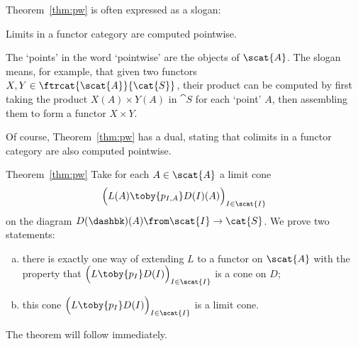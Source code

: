 Theorem~\ref{thm:pw} is often expressed as a slogan:
% 
\begin{slogan}
Limits in a functor category are computed pointwise.%
%
%
%
\end{slogan}
% 
The `points' in the word `pointwise' are the objects of $\scat{A}$.  The
slogan means, for example, that given two functors $X, Y \in
\ftrcat{\scat{A}}{\cat{S}}$, their product can be computed by first taking
the product $X(A) \times Y(A)$ in $\cat{S}$ for each `point' $A$, then
assembling them to form a functor $X \times Y$.

Of course, Theorem~\ref{thm:pw} has a dual, stating that colimits in a
functor category are also computed pointwise.

\begin{pfof}{Theorem~\ref{thm:pw}}
Take for each $A \in \scat{A}$ a limit cone 
% 
\begin{equation}
\label{eq:pw-cone}
\Bigl( L(A) \toby{p_{I, A}} D(I)(A) \Bigr)_{I \in \scat{I}}
\end{equation}
% 
on the diagram $D(\dashbk)(A)\from \scat{I} \to \cat{S}$.  We prove two
statements:
% 
\begin{enumerate}[(b)]
\item 
\label{item:pw-lift} 
there is exactly one way of extending $L$ to a functor on $\scat{A}$ with
the property that $\Bigl(L \toby{p_I} D(I)\Bigr)_{I \in \scat{I}}$ is a
cone on $D$;  

\item   
\label{item:pw-lim}
this cone $\Bigl(L \toby{p_I} D(I)\Bigr)_{I \in \scat{I}}$ is a limit cone.
\end{enumerate}
% 
The theorem will follow immediately.


\end{pfof}
